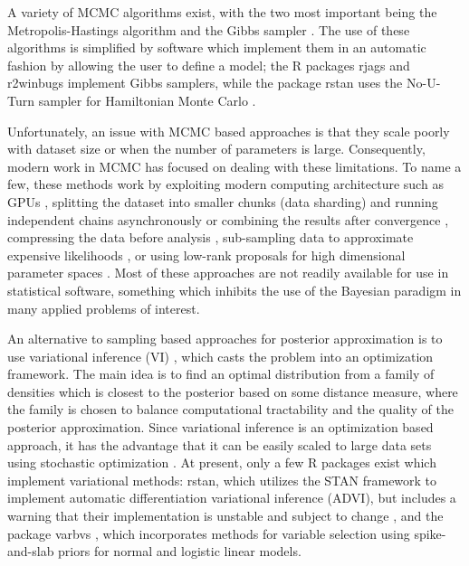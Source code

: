\documentclass[]{article}
\let\proglang=\textsf
\newcommand{\pkg}[1]{{\fontseries{b}\selectfont #1}}
\begin{document}
A variety of MCMC algorithms exist, with the two most important being the
Metropolis-Hastings algorithm \citep{metropolis1953, hastings1970monte} and the
Gibbs sampler \citep{geman1984stochastic, gelfand1990sampling}. The use of these
algorithms is simplified by software which implement them in an automatic
fashion by allowing the user to define a model; the \proglang{R} packages
\pkg{rjags} \citep{plummer2019rjags} and \pkg{r2winbugs} \citep{r2winbugs}
implement Gibbs samplers, while the package \pkg{rstan} \citep{stan2018rstan}
uses the No-U-Turn sampler \citep{hoffman2014no} for Hamiltonian Monte Carlo
\citep{betancourt2017conceptual}.

Unfortunately, an issue with MCMC based approaches is that they scale poorly
with dataset size or when the number of parameters is large. Consequently,
modern work in MCMC has focused on dealing with these limitations. To name a
few, these methods work by exploiting modern computing architecture such as GPUs
\citep{terenin2019gpu}, splitting the dataset into smaller chunks (data
sharding) and running independent chains asynchronously
\citep{terenin2020asynchronous} or combining the results after convergence
\citep{consensusmc, srivastava2015wasp}, compressing the data before analysis
\citep{bayesiancompressed}, sub-sampling data to approximate expensive
likelihoods \citep{quiroz2018speeding, sgdmcmc}, or using low-rank proposals for
high dimensional parameter spaces \citep{saibaba2019efficient}.  Most of these
approaches are not readily available for use in statistical software, something
which inhibits the use of the Bayesian paradigm in many applied problems of
interest. 

An alternative to sampling based approaches for posterior approximation is to
use variational inference (VI) \citep{blei2017variational}, which casts the
problem into an optimization framework. The main idea is to find an optimal
distribution from a family of densities which is closest to the posterior based
on some distance measure, where the family is chosen to balance computational
tractability and the quality of the posterior approximation. Since variational
inference is an optimization based approach, it has the advantage that it can be
easily scaled to large data sets using stochastic optimization
\citep{hoffman2013svi}.  At present, only a few \proglang{R} packages exist
which implement variational methods: \pkg{rstan}, which utilizes the \pkg{STAN}
framework to implement automatic differentiation variational inference (ADVI),
but includes a warning that their implementation is unstable and subject to
change \citep{stan2018rstan, advipaper}, and the package \pkg{varbvs}
\citep{carbonetto2012scalable}, which incorporates methods for variable
selection using spike-and-slab priors for normal and logistic linear models.
\end{document}
